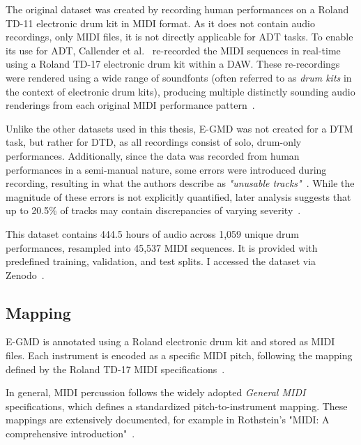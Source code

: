 The original dataset was created by recording human performances on a Roland TD-11 electronic drum kit in MIDI format. As it does not contain audio recordings, only MIDI files, it is not directly applicable for \gls{ADT} tasks. To enable its use for \gls{ADT}, Callender et al.~\cite{callender2020improvingperceptualqualitydrum} re-recorded the MIDI sequences in real-time using a Roland TD-17 electronic drum kit within a \gls{DAW}. These re-recordings were rendered using a wide range of soundfonts (often referred to as \textit{drum kits} in the context of electronic drum kits), producing multiple distinctly sounding audio renderings from each original MIDI performance pattern~\cite{pmlr-v97-gillick19a, callender2020improvingperceptualqualitydrum}.

Unlike the other datasets used in this thesis, E-GMD was not created for a \gls{DTM} task, but rather for \gls{DTD}, as all recordings consist of solo, drum-only performances. Additionally, since the data was recorded from human performances in a semi-manual nature, some errors were introduced during recording, resulting in what the authors describe as \textit{"unusable tracks"}~\cite{callender2020improvingperceptualqualitydrum}. While the magnitude of these errors is not explicitly quantified, later analysis suggests that up to 20.5\% of tracks may contain discrepancies of varying severity~\cite{holz2021automatic}.

This dataset contains 444.5 hours of audio across 1,059 unique drum performances, resampled into 45,537 MIDI sequences. It is provided with predefined training, validation, and test splits. I accessed the dataset via Zenodo~\cite{callender_2020_4300943, callender2020improvingperceptualqualitydrum}.

\subsection{Mapping}

E-GMD is annotated using a Roland electronic drum kit and stored as MIDI files. Each instrument is encoded as a specific MIDI pitch, following the mapping defined by the Roland TD-17 MIDI specifications~\cite{pmlr-v97-gillick19a, callender2020improvingperceptualqualitydrum, roland_drum_midi_td_17}.

In general, MIDI percussion follows the widely adopted \textit{General MIDI} specifications, which defines a standardized pitch-to-instrument mapping. These mappings are extensively documented, for example in Rothstein's "MIDI: A comprehensive introduction"~\cite{rothstein1995midi}.

